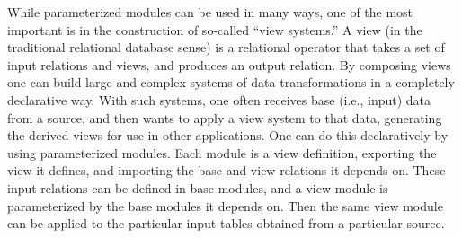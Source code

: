 While parameterized modules can be used in many ways, one of the most
important is in the construction of so-called ``view systems.''  A view
(in the traditional relational database sense) is a relational
operator that takes a set of input relations and views, and produces
an output relation.  By composing views one can build large and
complex systems of data transformations in a completely declarative
way.  With such systems, one often receives base (i.e., input) data
from a source, and then wants to apply a view system to that data,
generating the derived views for use in other applications.  One can
do this declaratively by using parameterized modules.  Each module is
a view definition, exporting the view it defines, and importing the
base and view relations it depends on.  These input relations can be
defined in base modules, and a view module is parameterized by the
base modules it depends on.  Then the same view module can be applied
to the particular input tables obtained from a particular source.




